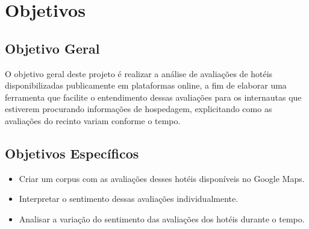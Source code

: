 \chapter{Objetivos}

\label{cap:objetivos}

\section{Objetivo Geral}

O objetivo geral deste projeto é realizar a análise de avaliações de hotéis disponibilizadas publicamente em plataformas online, a fim de elaborar uma ferramenta que facilite o entendimento dessas avaliações para os internautas que estiverem procurando informações de hospedagem, explicitando como as avaliações do recinto variam conforme o tempo.

\section{Objetivos Específicos}

\begin{itemize}
    \item Criar um corpus com as avaliações desses hotéis disponíveis no Google Maps.
    \item Interpretar o sentimento dessas avaliações individualmente.
    \item Analisar a variação do sentimento das avaliações dos hotéis durante o tempo.
\end{itemize}

